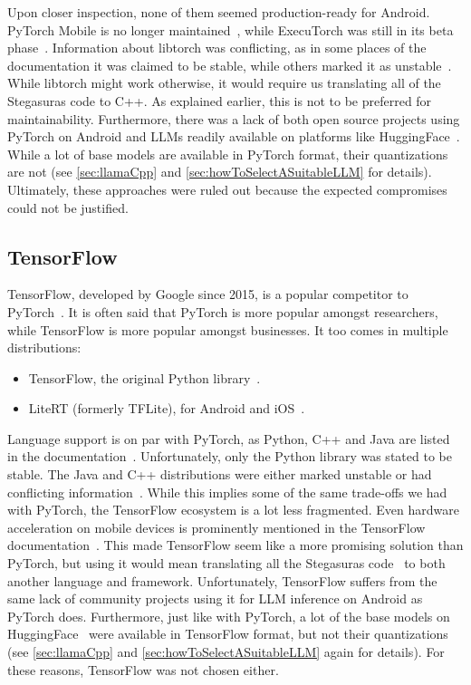 Upon closer inspection, none of them seemed production-ready for Android. PyTorch Mobile is no longer maintained~\cite{pytorchPytorchAndroiddemoapp2025}, while ExecuTorch was still in its beta phase~\cite{pytorchPytorchExecutorch2025}. Information about libtorch was conflicting, as in some places of the documentation it was claimed to be stable, while others marked it as unstable~\cite{pytorchStartLocally,pytorchPyTorchAPIPyTorch}. While libtorch might work otherwise, it would require us translating all of the Stegasuras code to C++. As explained earlier, this is not to be preferred for maintainability. Furthermore, there was a lack of both open source projects using PyTorch on Android and \glspl{LLM} readily available on platforms like HuggingFace~\cite{huggingfaceModelsHuggingFace2025}. While a lot of base models are available in PyTorch format, their quantizations are not (see \cref{sec:llamaCpp} and \cref{sec:howToSelectASuitableLLM} for details). Ultimately, these approaches were ruled out because the expected compromises could not be justified.

\subsection{TensorFlow}
\label{sec:tensorFlow}
TensorFlow, developed by Google since 2015, is a popular competitor to PyTorch~\cite{abadiTensorFlowLargescaleMachine2015}. It is often said that PyTorch is more popular amongst researchers, while TensorFlow is more popular amongst businesses. It too comes in multiple distributions:
\begin{itemize}
	\item TensorFlow, the original Python library~\cite{abadiTensorFlowLargescaleMachine2015}.
	\item LiteRT (formerly TFLite), for Android and iOS~\cite{googleaiedgeteamTensorFlowLiteNow2024,googleGoogleaiedgeLiteRT2025}.
\end{itemize}

Language support is on par with PyTorch, as Python, C++ and Java are listed in the documentation~\cite{tensorflowTensorFlow}. Unfortunately, only the Python library was stated to be stable. The Java and C++ distributions were either marked unstable or had conflicting information~\cite{abadiTensorFlowLargescaleMachine2015,tensorflowAPIDocumentationTensorFlow}. While this implies some of the same trade-offs we had with PyTorch, the TensorFlow ecosystem is a lot less fragmented. Even hardware acceleration on mobile devices is prominently mentioned in the TensorFlow documentation~\cite{tensorflowTensorFlow}. This made TensorFlow seem like a more promising solution than PyTorch, but using it would mean translating all the Stegasuras code~\cite{zieglerHarvardnlpNeuralSteganography2025} to both another language and framework. Unfortunately, TensorFlow suffers from the same lack of community projects using it for \gls{LLM} inference on Android as PyTorch does. Furthermore, just like with PyTorch, a lot of the base models on HuggingFace~\cite{huggingfaceModelsHuggingFace2025} were available in TensorFlow format, but not their quantizations (see \cref{sec:llamaCpp} and \cref{sec:howToSelectASuitableLLM} again for details). For these reasons, TensorFlow was not chosen either.

